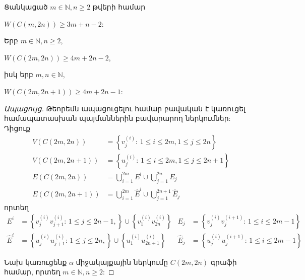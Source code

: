 \begin{hide}
\begin{theorem} \cite{PetrosyanKarapetyan2007}
\label{t2_cylinder_W_evencycle} Ցանկացած $m\in \mathbb{N}, n\geq 2$ թվերի համար
\begin{center}
$W(C(m,2n))\geq 3m+n-2$:
\end{center}
\end{theorem}
\begin{theorem}
\label{t2_cylinder_W_evenpath} Երբ $m\in\mathbb{N},n\geq 2$, 
\begin{center}
$W(C(2m,2n))\geq 4m+2n-2$,
\end{center}
իսկ երբ $m,n\in\mathbb{N}$,
\begin{center}
$W(C(2m,2n+1))\geq 4m+2n-1$:
\end{center}
\end{theorem}
\begin{proof}[Ապացույց] Թեորեմն ապացուցելու համար բավական է կառուցել համապատասխան պայմաններին բավարարող ներկումներ: Դիցուք 
\begin{align*}
V(C(2m,2n))&=\left\{v_{j}^{(i)}\colon\,1\leq i\leq 2m,1\leq j\leq 2n\right\}\\
V(C(2m,2n+1))&=\left\{u_{j}^{(i)}\colon\,1\leq i\leq 2m,1\leq j\leq 2n+1\right\}\\
E(C(2m,2n))&=\bigcup_{i=1}^{2m}E^{i}\cup \bigcup_{j=1}^{2n}E_{j} \\
E(C(2m,2n+1))&=\bigcup_{i=1}^{2m}\hat{E}^{i}\cup \bigcup_{j=1}^{2n+1}\hat{E}_{j}
\end{align*}
որտեղ 
\begin{align*}
E^{i}&=\left\{v_{j}^{(i)}v_{j+1}^{(i)}\colon\,1\leq j\leq
2n-1,\right\}\cup \left\{v_{1}^{(i)}v_{2n}^{(i)}\right\}
&E_{j}&=\left\{v_{j}^{(i)}v_{j}^{(i+1)}\colon\,1\leq i\leq
2m-1\right\}\\
\hat{E}^{i}&=\left\{u_{j}^{(i)}u_{j+1}^{(i)}\colon\,1\leq j\leq
2n,\right\}\cup \left\{u_{1}^{(i)}u_{2n+1}^{(i)}\right\}
&\hat{E}_{j}&=\left\{u_{j}^{(i)}u_{j}^{(i+1)}\colon\,1\leq i\leq
2m-1\right\}
\end{align*}

Նախ կառուցենք $\alpha$ միջակայքային ներկումը $C(2m,2n)$ գրաֆի համար, որտեղ $m\in\mathbb{N},n\geq 2$:


\end{proof}
\end{hide}
